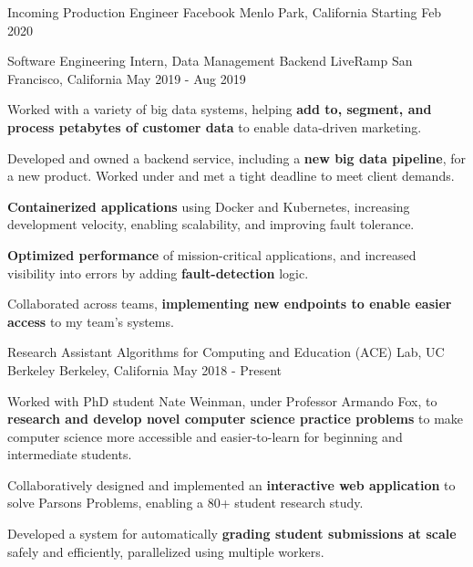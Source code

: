 

\begin{cventries}


\cventry
{Incoming Production Engineer}
{Facebook}
{Menlo Park, California}
{Starting Feb 2020}
{}

\vspace{-5mm}


    \cventry
      {Software Engineering Intern, Data Management Backend}
      {LiveRamp}
      {San Francisco, California}
      {May 2019 - Aug 2019}
      {
        \begin{cvitems}
          \item Worked with a variety of big data systems, helping \textbf{add to, segment, and process petabytes of customer data} to enable data-driven marketing.
          \item Developed and owned a backend service, including a \textbf{new big data pipeline}, for a new product. Worked under and met a tight deadline to meet client demands.
          \item \textbf{Containerized applications} using Docker and Kubernetes, increasing development velocity, enabling scalability, and improving fault tolerance.         
          \item \textbf{Optimized performance} of mission-critical applications, and increased visibility into errors by adding \textbf{fault-detection} logic.
          \item Collaborated across teams, \textbf{implementing new endpoints to enable easier access} to my team's systems.
        \end{cvitems}
      }

    \cventry
      {Research Assistant}
      {Algorithms for Computing and Education (ACE) Lab, UC Berkeley}
      {Berkeley, California}
      {May 2018 - Present}
      {
        \begin{cvitems}
          \item Worked with PhD student Nate Weinman, under Professor Armando Fox, to \textbf{research and develop novel computer science practice problems}
          to make computer science more accessible and easier-to-learn for beginning and intermediate students.
          \item Collaboratively designed and implemented an \textbf{interactive web application} to solve Parsons Problems, enabling a 80+ student research study. 
          \item Developed a system for automatically \textbf{grading student submissions at scale} safely and efficiently, parallelized using multiple workers.
        \end{cvitems}  
      }

\end{cventries}
